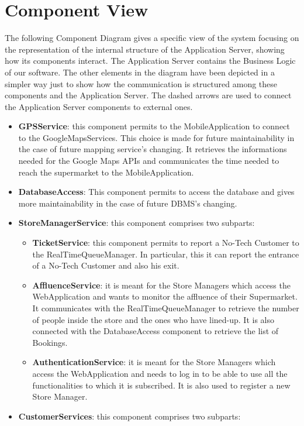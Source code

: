 \section{Component View}

The following Component Diagram gives a specific view of the system focusing on the representation of the internal structure of the Application Server, showing how its components interact. The Application Server contains the Business Logic of our software. The other elements in the diagram have been depicted in a simpler way just to show how the communication is structured among these components and the Application Server. The dashed arrows are used to connect the Application Server components to external ones.

\begin{itemize}
	\item\textbf{GPSService}: this component permits to the MobileApplication to connect to the GoogleMapsServices. This choice is made for future maintainability in the case of future mapping service’s changing. It retrieves the informations needed for the Google Maps APIs and communicates the time needed to reach the supermarket to the MobileApplication.
	\item\textbf{DatabaseAccess}: This component permits to access the database and gives more maintainability in the case of future DBMS’s changing.
	\item\textbf{StoreManagerService}: this component comprises two subparts:
	\begin{itemize}
		\item\textbf{TicketService}: this component permits to report a No-Tech Customer to the RealTimeQueueManager. In particular, this it can report the entrance of a No-Tech Customer and also his exit.
		\item\textbf{AffluenceService}: it is meant for the Store Managers which access the WebApplication and wants to monitor the affluence of their Supermarket. It communicates with the RealTimeQueueManager to retrieve the number of people inside the store and the ones who have lined-up. It is also connected with the DatabaseAccess component to retrieve the list of Bookings.
		\item\textbf{AuthenticationService}: it is meant for the Store Managers which access the WebApplication and needs to log in to be able to use all the functionalities to which it is subscribed. It is also used to register a new Store Manager.
	\end{itemize}
	\item\textbf{CustomerServices}: this component comprises two subparts:

\end{itemize}
